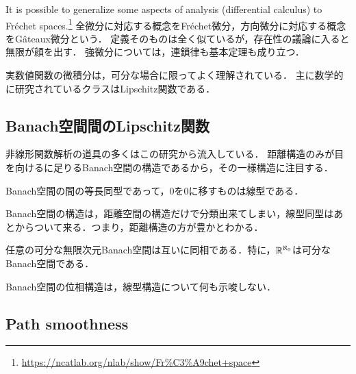 \documentclass[uplatex,dvipdfmx]{jsreport}
\begin{document}
\begin{tcolorbox}[colframe=ForestGreen, colback=ForestGreen!10!white,breakable,colbacktitle=ForestGreen!40!white,coltitle=black,fonttitle=\bfseries\sffamily,
title=]
    It is possible to generalize some aspects of analysis (differential calculus) to Fréchet spaces.\footnote{\url{https://ncatlab.org/nlab/show/Fr\%C3\%A9chet+space}}
    全微分に対応する概念をFréchet微分，方向微分に対応する概念をGâteaux微分という．
    定義そのものは全く似ているが，存在性の議論に入ると無限が顔を出す．
    強微分については，連鎖律も基本定理も成り立つ．

    実数値関数の微積分は，可分な場合に限ってよく理解されている．
    主に数学的に研究されているクラスはLipschitz関数である．
\end{tcolorbox}

\subsection{Banach空間間のLipschitz関数}

\begin{tcolorbox}[colframe=ForestGreen, colback=ForestGreen!10!white,breakable,colbacktitle=ForestGreen!40!white,coltitle=black,fonttitle=\bfseries\sffamily,
title=]
    非線形関数解析の道具の多くはこの研究から流入している．
    距離構造のみが目を向けるに足りるBanach空間の構造であるから，その一様構造に注目する．\cite{Lindenstrauss}
\end{tcolorbox}

\begin{theorem}
    Banach空間の間の等長同型であって，$0$を$0$に移すものは線型である．
\end{theorem}
\begin{remarks}
    Banach空間の構造は，距離空間の構造だけで分類出来てしまい，線型同型はあとからついて来る．つまり，距離構造の方が豊かとわかる．
\end{remarks}

\begin{theorem}[Kadec]
    任意の可分な無限次元Banach空間は互いに同相である．特に，$\mathbb{R}^{\aleph_0}$は可分なBanach空間である．
\end{theorem}
\begin{remarks}
    Banach空間の位相構造は，線型構造について何も示唆しない．
\end{remarks}

\subsection{Path smoothness}
\end{document}
